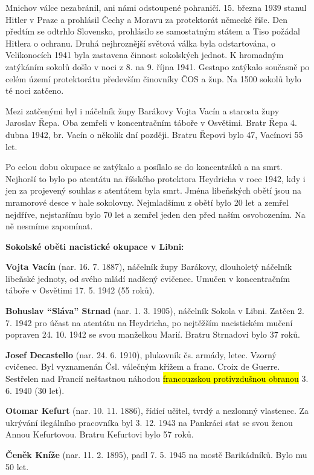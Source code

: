 Mnichov válce nezabránil, ani námi odstoupené pohraničí. 15. března 1939
stanul Hitler v Praze a prohlásil Čechy a Moravu za protektorát německé
říše. Den předtím se odtrhlo Slovensko, prohlásilo se samostatným státem
a Tiso požádal Hitlera o ochranu. Druhá nejhroznější světová válka byla
odstartována, o Velikonocích 1941 byla zastavena činnost sokolských
jednot. K hromadným zatýkáním sokolů došlo v noci z 8. na 9. října 1941.
Gestapo zatýkalo současně po celém území protektorátu především
činovníky ČOS a žup. Na 1500 sokolů bylo té noci zatčeno.

Mezi zatčenými byl i náčelník župy Barákovy Vojta Vacín a starosta župy
Jaroslav Řepa. Oba zemřeli v koncentračním táboře v Osvětimi. Bratr Řepa
4. dubna 1942, br. Vacín o několik dní později. Bratru Řepovi bylo 47,
Vacínovi 55 let.

Po celou dobu okupace se zatýkalo a posílalo se do koncentráků a na
smrt. Nejhorší to bylo po atentátu na říšského protektora Heydricha v
roce 1942, kdy i jen za projevený souhlas s atentátem byla smrt. Jména
libeňských obětí jsou na mramorové desce v hale sokolovny. Nejmladšímu z
obětí bylo 20 let a zemřel nejdříve, nejstaršímu bylo 70 let a zemřel
jeden den před naším osvobozením. Na ně nesmíme zapomínat.

\textbf{Sokolské oběti nacistické okupace v Libni:}

\textbf{Vojta Vacín} (nar. 16. 7. 1887), náčelník župy Barákovy,
dlouholetý náčelník libeňské jednoty, od svého mládí nadšený cvičenec.
Umučen v koncentračním táboře v Osvětimi 17. 5. 1942 (55 roků).

\textbf{Bohuslav ``Sláva'' Strnad} (nar. 1. 3. 1905), náčelník Sokola v
Libni. Zatčen 2. 7. 1942 pro účast na atentátu na Heydricha, po
nejtěžším nacistickém mučení popraven 24. 10. 1942 se svou manželkou
Marií. Bratru Strnadovi bylo 37 roků.

\textbf{Josef Decastello} (nar. 24. 6. 1910), plukovník čs. armády,
letec. Vzorný cvičenec. Byl vyznamenán Čsl. válečným křížem a franc.
Croix de Guerre. Sestřelen nad Francií nešťastnou náhodou
\hl{francouzskou protivzdušnou obranou} 3. 6. 1940 (30 let).

\textbf{Otomar Kefurt} (nar. 10. 11. 1886), řídící učitel, tvrdý a
nezlomný vlastenec. Za ukrývání ilegálního pracovníka byl 3. 12. 1943 na
Pankráci sťat se svou ženou Annou Kefurtovou. Bratru Kefurtovi bylo 57
roků.

\textbf{Čeněk Kníže} (nar. 11. 2. 1895), padl 7. 5. 1945 na mostě
Barikádníků. Bylo mu 50 let.

